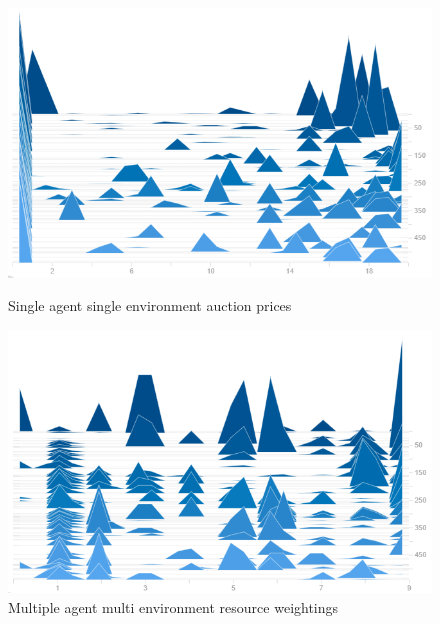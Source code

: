 \begin{figure}[h]
    \centering
    \begin{minipage}{0.5\textwidth}
        \centering
        \includegraphics[width=1.0\textwidth]{figures/env_training_fig/single_agent_single_env_auction_price.png}
        \caption{Single agent single environment auction prices}
        \label{fig:single_agent_single_env_auction_prices}
    \end{minipage}\hfill
    \begin{minipage}{0.5\textwidth}
        \centering
        \includegraphics[width=1.0\textwidth]{figures/env_training_fig/single_agent_single_env_weightings.png}
        \caption{Multiple agent multi environment resource weightings}
        \label{fig:single_agent_single_env_resource_weightings}
    \end{minipage}
\end{figure}


